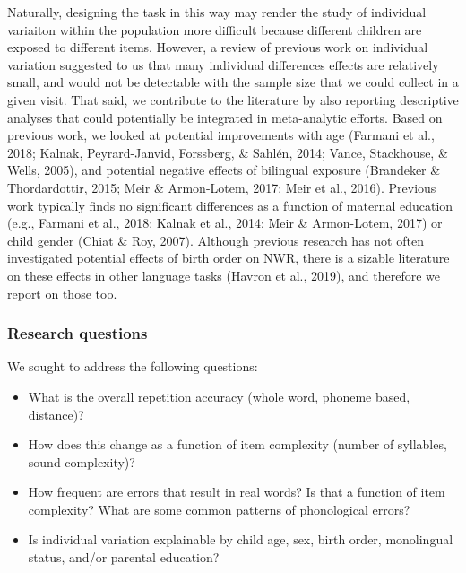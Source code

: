 \documentclass[english,,man,floatsintext]{apa6}
\providecommand{\tightlist}{%
  \setlength{\itemsep}{0pt}\setlength{\parskip}{0pt}}
\begin{document}
Naturally, designing the task in this way may render the study of individual variaiton within the population more difficult because different children are exposed to different items. However, a review of previous work on individual variation suggested to us that many individual differences effects are relatively small, and would not be detectable with the sample size that we could collect in a given visit. That said, we contribute to the literature by also reporting descriptive analyses that could potentially be integrated in meta-analytic efforts. Based on previous work, we looked at potential improvements with age (Farmani et al., 2018; Kalnak, Peyrard-Janvid, Forssberg, \& Sahlén, 2014; Vance, Stackhouse, \& Wells, 2005), and potential negative effects of bilingual exposure (Brandeker \& Thordardottir, 2015; Meir \& Armon-Lotem, 2017; Meir et al., 2016). Previous work typically finds no significant differences as a function of maternal education (e.g., Farmani et al., 2018; Kalnak et al., 2014; Meir \& Armon-Lotem, 2017) or child gender (Chiat \& Roy, 2007). Although previous research has not often investigated potential effects of birth order on NWR, there is a sizable literature on these effects in other language tasks (Havron et al., 2019), and therefore we report on those too.

\hypertarget{research-questions}{%
\subsubsection{Research questions}\label{research-questions}}

We sought to address the following questions:

\begin{itemize}
\tightlist
\item
  What is the overall repetition accuracy (whole word, phoneme based, distance)?
\item
  How does this change as a function of item complexity (number of syllables, sound complexity)?
\item
  How frequent are errors that result in real words? Is that a function of item complexity? What are some common patterns of phonological errors?
\item
  Is individual variation explainable by child age, sex, birth order, monolingual status, and/or parental education?
\end{itemize}
\end{document}
